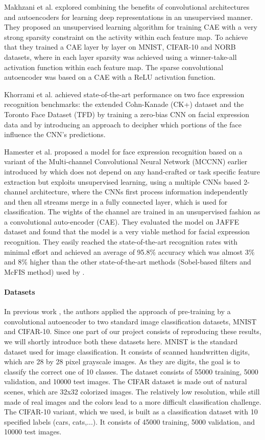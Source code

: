 \documentclass{article}
\begin{document}
Makhzani et al. \citep{Makhzani14} explored combining the benefits of convolutional architectures and autoencoders for learning deep representations in an unsupervised manner. They proposed an unsupervised learning algorithm for training CAE with a very strong sparsity constraint on the activity within each feature map. To achieve that they trained a CAE layer by layer on MNIST, CIFAR-10 and NORB datasets, where in each layer sparsity was achieved using a winner-take-all activation function within each feature map.  The sparse convolutional autoencoder was based on a CAE with a ReLU activation function.

Khorrami et al. \citep{Khorrami17} achieved state-of-the-art performance on two face expression recognition
benchmarks: the extended Cohn-Kanade (CK+) dataset
and the Toronto Face Dataset (TFD) by training a zero-bias CNN on facial expression data and by introducing an approach to decipher which portions of the face influence the CNN’s predictions.

Hamester et al. \citep{hamester15} proposed a model for face expression recognition based on a variant of the Multi-channel Convolutional Neural Network (MCCNN) earlier introduced by \cite{Barros14} which does not depend on any hand-crafted or task specific feature extraction but exploits unsupervised learning, using a multiple CNNs based 2-channel architecture, where the CNNs first process information independently and then all streams merge in a fully connected layer, which is used for classification. The wights of the channel are trained in an unsupervised fashion as a convolutional auto-encoder (CAE). They evaluated the model on JAFFE dataset and found that the model is a very viable method for facial expression recognition. They easily reached the state-of-the-art recognition rates with minimal effort and achieved an average of 95.8\% accuracy which was almost 3\% and 8\% higher than the other state-of-the-art methods (Sobel-based filters and McFIS method) used by \citep{Subramanian12}.

\paragraph{Datasets}
In previous work \citep{masci2011stacked}, the authors applied the approach of pre-training by a convolutional autoencoder to two standard image classification datasets, MNIST and CIFAR-10.
Since one part of our project consists of reproducing these results, we will shortly introduce both these datasets here.
MNIST \citep{lecun1998mnist} is the standard dataset used for image classification. It consists of scanned handwritten digits, which are 28 by 28 pixel grayscale images. As they are digits, the goal is to classify the correct one of 10 classes.
The dataset consists of 55000 training, 5000 validation, and 10000 test images.
The CIFAR dataset \citep{krizhevsky2009learning} is made out of natural scenes, which are 32x32 colorized images. The relatively low resolution, while still made of real images and the colors lead to a more difficult classification challenge.
The CIFAR-10 variant, which we used, is built as a classification dataset with 10 specified labels (cars, cats,...).
It consists of 45000 training, 5000 validation, and 10000 test images.
\end{document}
